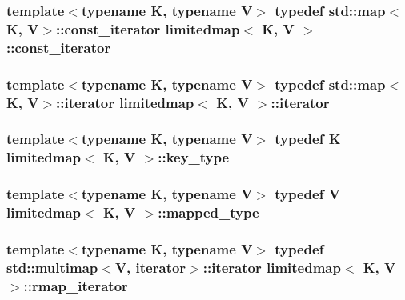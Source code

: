 \subsubsection[{const\+\_\+iterator}]{\setlength{\rightskip}{0pt plus 5cm}template$<$typename K, typename V$>$ typedef std\+::map$<$K, V$>$\+::{\bf const\+\_\+iterator} {\bf limitedmap}$<$ K, V $>$\+::{\bf const\+\_\+iterator}}\label{classlimitedmap_ab0a3e4f2ec7c82359300c83a35ae2500}
\hypertarget{classlimitedmap_aea661213ab6f699e9667bea25bf99821}{}
\subsubsection[{iterator}]{\setlength{\rightskip}{0pt plus 5cm}template$<$typename K, typename V$>$ typedef std\+::map$<$K, V$>$\+::{\bf iterator} {\bf limitedmap}$<$ K, V $>$\+::{\bf iterator}\hspace{0.3cm}{\ttfamily [protected]}}\label{classlimitedmap_aea661213ab6f699e9667bea25bf99821}
\hypertarget{classlimitedmap_aebf71255c65df699225cdcefe88717b9}{}
\subsubsection[{key\+\_\+type}]{\setlength{\rightskip}{0pt plus 5cm}template$<$typename K, typename V$>$ typedef K {\bf limitedmap}$<$ K, V $>$\+::{\bf key\+\_\+type}}\label{classlimitedmap_aebf71255c65df699225cdcefe88717b9}
\hypertarget{classlimitedmap_a8bd6b8e7f91f0a141c91c382b492c03c}{}
\subsubsection[{mapped\+\_\+type}]{\setlength{\rightskip}{0pt plus 5cm}template$<$typename K, typename V$>$ typedef V {\bf limitedmap}$<$ K, V $>$\+::{\bf mapped\+\_\+type}}\label{classlimitedmap_a8bd6b8e7f91f0a141c91c382b492c03c}
\hypertarget{classlimitedmap_ad3d926b1f365d819073ddaed8daa4400}{}
\subsubsection[{rmap\+\_\+iterator}]{\setlength{\rightskip}{0pt plus 5cm}template$<$typename K, typename V$>$ typedef std\+::multimap$<$V, {\bf iterator}$>$\+::{\bf iterator} {\bf limitedmap}$<$ K, V $>$\+::{\bf rmap\+\_\+iterator}\hspace{0.3cm}{\ttfamily [protected]}}\label{classlimitedmap_ad3d926b1f365d819073ddaed8daa4400}
\hypertarget{classlimitedmap_a1c564b323f94e182e56aa27975e5f9d1}{}
